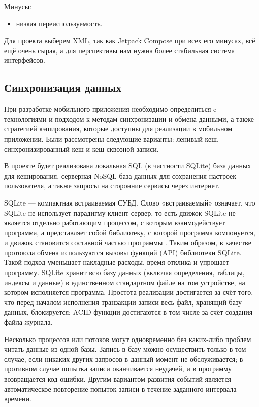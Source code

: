 Минусы:
\begin{itemize}
 \item низкая переиспользуемость.
\end{itemize}

Для проекта выберем XML, так как Jetpack Compose при всех его минусах, всё ещё очень сырая, а для перспективы нам нужна более стабильная система интерфейсов.

\subsection{Синхронизация данных}
При разработке мобильного приложения необходимо определиться c технологиями и подходом к методам синхронизации и обмена данными, а также стратегией кэширования, которые доступны для реализации в мобильном приложении. Были рассмотрены следующие варианты: ленивый кеш, синхронизированный кеш и кеш сквозной записи. 
 
В проекте будет реализована локальная SQL (в частности SQLite) база данных для кеширования, серверная NoSQL база данных для сохранения настроек пользователя, а также запросы на сторонние сервисы через интернет.

SQLite — компактная встраиваемая СУБД. Слово «встраиваемый» означает, что SQLite не использует парадигму клиент-сервер, то есть движок SQLite не является отдельно работающим процессом, с которым взаимодействует программа, а представляет собой библиотеку, с которой программа компонуется, и движок становится составной частью программы \cite{sqlite1}. Таким образом, в качестве протокола обмена используются вызовы функций (API) библиотеки SQLite. Такой подход уменьшает накладные расходы, время отклика и упрощает программу. SQLite хранит всю базу данных (включая определения, таблицы, индексы и данные) в единственном стандартном файле на том устройстве, на котором исполняется программа. Простота реализации достигается за счёт того, что перед началом исполнения транзакции записи весь файл, хранящий базу данных, блокируется; ACID-функции достигаются в том числе за счёт создания файла журнала.

Несколько процессов или потоков могут одновременно без каких-либо проблем читать данные из одной базы. Запись в базу можно осуществить только в том случае, если никаких других запросов в данный момент не обслуживается; в противном случае попытка записи оканчивается неудачей, и в программу возвращается код ошибки. Другим вариантом развития событий является автоматическое повторение попыток записи в течение заданного интервала времени.

